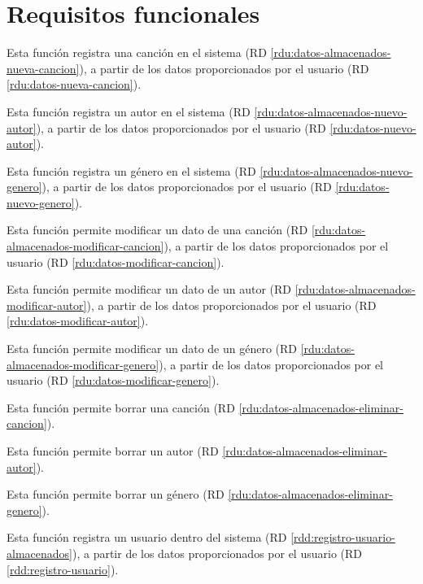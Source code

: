 \section{Requisitos funcionales}

Esta función registra una canción en el sistema (RD \ref{rdu:datos-almacenados-nueva-cancion}), a partir de los datos proporcionados por el usuario (RD \ref{rdu:datos-nueva-cancion}).

Esta función registra un autor en el sistema (RD \ref{rdu:datos-almacenados-nuevo-autor}), a partir de los datos proporcionados por el usuario (RD \ref{rdu:datos-nuevo-autor}).

Esta función registra un género en el sistema (RD \ref{rdu:datos-almacenados-nuevo-genero}), a partir de los datos proporcionados por el usuario (RD \ref{rdu:datos-nuevo-genero}).

Esta función permite modificar un dato de una canción (RD \ref{rdu:datos-almacenados-modificar-cancion}), a partir de los datos proporcionados por el usuario (RD \ref{rdu:datos-modificar-cancion}).

Esta función permite modificar un dato de un autor (RD \ref{rdu:datos-almacenados-modificar-autor}), a partir de los datos proporcionados por el usuario (RD \ref{rdu:datos-modificar-autor}).

Esta función permite modificar un dato de un género (RD \ref{rdu:datos-almacenados-modificar-genero}), a partir de los datos proporcionados por el usuario (RD \ref{rdu:datos-modificar-genero}).

Esta función permite borrar una canción (RD \ref{rdu:datos-almacenados-eliminar-cancion}).

Esta función permite borrar un autor (RD \ref{rdu:datos-almacenados-eliminar-autor}).

Esta función permite borrar un género (RD \ref{rdu:datos-almacenados-eliminar-genero}).


Esta función registra un usuario dentro del sistema (RD \ref{rdd:registro-usuario-almacenados}), a partir de los datos proporcionados por el usuario (RD \ref{rdd:registro-usuario}).

